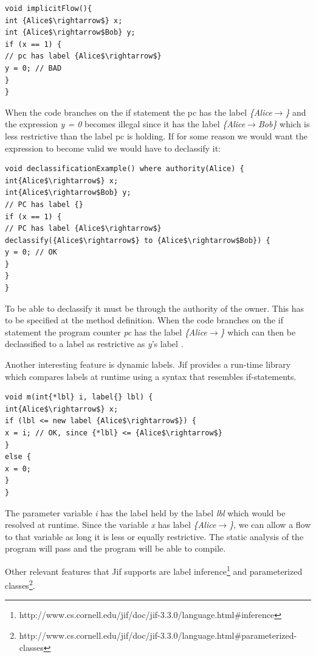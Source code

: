 \begin{lstlisting}[mathescape]
void implicitFlow(){
int {Alice$\rightarrow$} x;
int {Alice$\rightarrow$Bob} y;
if (x == 1) { 
// pc has label {Alice$\rightarrow$}
y = 0; // BAD
}
}
\end{lstlisting}

When the code branches on the if statement the pc has the label \emph{\{Alice$\rightarrow$\}} and the expression \emph{y = 0} becomes illegal since it has the label \emph{\{Alice$\rightarrow$Bob\}} which is less restrictive than the label pc is holding. If for some reason we would want the expression to become valid we would have to declassify it:

\begin{lstlisting}[mathescape]
void declassificationExample() where authority(Alice) {
int{Alice$\rightarrow$} x;
int{Alice$\rightarrow$Bob} y;
// PC has label {}
if (x == 1) {
// PC has label {Alice$\rightarrow$}
declassify({Alice$\rightarrow$} to {Alice$\rightarrow$Bob}) {
y = 0; // OK
}
}
}
\end{lstlisting}

To be able to declassify it must be through the authority of the owner. This has to be specified at the method definition. When the code branches on the if statement the program counter \emph{pc} has the label \emph{\{Alice$\rightarrow$\}} which can then be declassified to a label as restrictive as \emph{y}'s label \cite{jifmanual} \cite{Srikant}.

Another interesting feature is dynamic labels. Jif provides a run-time library which compares labels at runtime using a syntax that resembles if-statements.
\begin{lstlisting}[mathescape]
void m(int{*lbl} i, label{} lbl) {
int{Alice$\rightarrow$} x;
if (lbl <= new label {Alice$\rightarrow$}) {
x = i; // OK, since {*lbl} <= {Alice$\rightarrow$}
}
else {
x = 0;
}
}
\end{lstlisting}

The parameter variable \emph{i} has the label held by the label \emph{lbl} which would be resolved at runtime. Since the variable \emph{x} has label \emph{\{Alice$\rightarrow$\}}, we can allow a flow to that variable as long it is less or equally restrictive. The static analysis of the program will pass and the program will be able to compile.  


Other relevant features that Jif supports are label inference\footnote{http://www.cs.cornell.edu/jif/doc/jif-3.3.0/language.html\#inference} and parameterized classes\footnote{http://www.cs.cornell.edu/jif/doc/jif-3.3.0/language.html\#parameterized-classes}.
